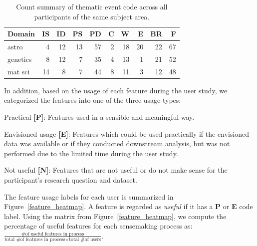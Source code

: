 \begin{table}[h!]
  \begin{tabular}{lrrrrrrrrr}
  \hline
   Domain           &   IS &   ID &   PS &   PD &   C &   W &   E &   BR &   F \\
  \hline
   astro            &    4 &   12 &   13 &   57 &   2 &  18 &  20 &   22 &  67 \\
   genetics         &    8 &   12 &    7 &   35 &   4 &  13 &   1 &   21 &  52 \\
   mat sci          &   14 &    8 &    7 &   44 &   8 &  11 &   3 &   12 &  48 \\
  \hline
  \end{tabular}
  \caption{Count summary of thematic event code across all participants of the same subject area.}
\end{table}
\npar In addition, based on the usage of each feature during the user study, we categorized the features into one of the three usage types:
\begin{denselist}
    \item Practical \textbf{[P]}: Features used in a sensible and meaningful way.
    \item Envisioned usage \textbf{[E]}: Features which could be used practically if the envisioned data was available or if they conducted downstream analysis, but was not performed due to the limited time during the user study.
    \item Not useful \textbf{[N]}: Features that are not useful or do not make sense for the participant's research question and dataset.
\end{denselist}
The feature usage labels for each user is summarized in Figure~\ref{feature_heatmap}. A feature is regarded as \emph{useful} if it has a \textbf{P} or \textbf{E} code label. Using the matrix from Figure~\ref{feature_heatmap}, we compute the percentage of useful features for each sensemaking process as: $\frac{\textrm{\# of useful features in process}}{\textrm{total \# of features in process} \times \textrm{total \# of users}}$.
\vspace{-5pt}
